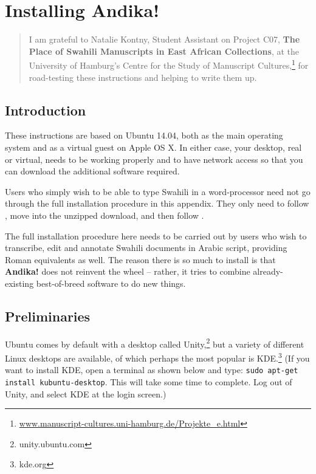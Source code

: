 \chapter{Installing \textbf{Andika!}}
\renewcommand{\thesection}{A/\arabic{section}}  %
\setcounter{section}{0}  %
\label{appA}


\begin{quotation}
\noindent I am grateful to Natalie Kontny, Student Assistant on Project C07, \textbf{The Place of Swahili Manuscripts in East African Collections},  at the University of Hamburg's Centre for the Study of Manuscript Cultures,\footnote{\url{www.manuscript-cultures.uni-hamburg.de/Projekte_e.html}} for road-testing these instructions and helping to write them up.
\end{quotation}

\section{Introduction}

These instructions are based on Ubuntu 14.04, both as the main operating system and as a virtual guest on Apple OS X. In either case, your desktop, real or virtual, needs to be working properly and to have network access so that you can download the additional software required.

Users who simply wish to be able to type Swahili in a word-processor need not go through the full installation procedure in this appendix.  They only need to follow , move into the unzipped download, and then follow .

The full installation procedure here needs to be carried out by users who wish to transcribe, edit and annotate Swahili documents in Arabic script, providing Roman equivalents as well.  The reason there is so much to install is that \textbf{Andika!} does not reinvent the wheel -- rather, it tries to combine already-existing best-of-breed software to do new things.

\section{Preliminaries}

Ubuntu comes by default with a desktop called Unity,\footnote{unity.ubuntu.com} but a variety of different Linux desktops are available, of which perhaps the most popular is KDE.\footnote{kde.org}  (If you want to install KDE, open a terminal as shown below and type: \verb|sudo apt-get install kubuntu-desktop|.  This will take some time to complete.  Log out of Unity, and select KDE at the login screen.)


